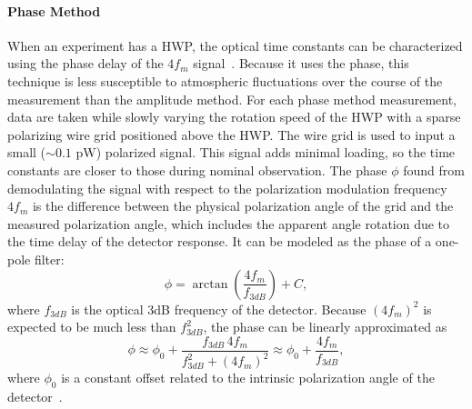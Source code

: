 \paragraph{Phase Method} When an experiment has a HWP, the optical time constants can be characterized using the phase delay of the $4f_{m}$ signal~\cite{Simon_LTD2013}. Because it uses the phase, this technique is less susceptible to atmospheric fluctuations over the course of the measurement than the amplitude method. For each phase method measurement, data are taken while slowly varying the rotation speed of the HWP with a sparse polarizing wire grid positioned above the HWP. The wire grid is used to input a small ($\sim0.1$ pW) polarized signal. This signal adds minimal loading, so the time constants are closer to those during nominal observation. The phase $\phi$ found from demodulating the signal with respect to the polarization modulation frequency $4f_{m}$ is the difference between the physical polarization angle of the grid and the measured polarization angle, which includes the apparent angle rotation due to the time delay of the detector response. It can be modeled as the phase of a one-pole filter: 
\begin{equation}\label{eqn:phi_shift}
\phi=\arctan{\left(\frac{4f_{m}}{f_{3dB}}\right)} + C,
\end{equation}
where $f_{3dB}$ is the optical 3dB frequency of the detector. Because $(4f_{m})^2$ is expected to be much less than $f_{3dB}^2$, the phase can be linearly approximated as 
\begin{equation}
\phi  \approx \phi_0 + \frac{f_{3dB}\,4f_{m}}{f_{3dB}^2+(4f_{m})^2}\approx  \phi_0 + \frac{4f_{m}}{f_{3dB}},
\end{equation}
where $\phi_0$ is a constant offset related to the intrinsic polarization angle of the detector~\cite{Simon_LTD2013}. 
